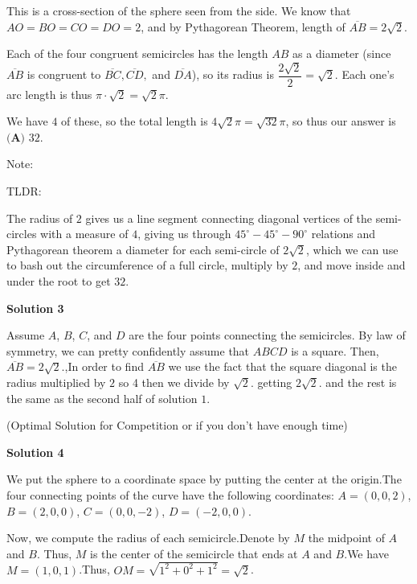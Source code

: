 \begin{enumerate}
 This is a cross-section of the sphere seen from the side. We know that ${AO}={BO}={CO}={DO}=2$, and by Pythagorean Theorem, length of  $\overline{AB}=2\sqrt2.$ 

 Each of the four congruent semicircles has the length $AB$ as a diameter (since $\overline{AB}$ is congruent to $\overline{BC},\overline{CD},$ and $\overline{DA}$), so its radius is $\dfrac{2\sqrt2}2=\sqrt2.$ Each one's arc length is thus $\pi\cdot\sqrt2=\sqrt2\pi.$ 

 We have $4$ of these, so the total length is $4\sqrt2\pi=\sqrt{32}\pi$, so thus our answer is $\boxed{\textbf{(A) }32.}$

 


 Note:

 TLDR:

 The radius of $2$ gives us a line segment connecting diagonal vertices of the semi-circles with a measure of $4$, giving us through $45^{\circ}-45^{\circ}-90^{\circ}$ relations and Pythagorean theorem a diameter for each semi-circle of $2\sqrt{2}$, which we can use to bash out the circumference of a full circle, multiply by $2$, and move inside and under the root to get $32$.

 



\textbf{Solution 3}

Assume $A$, $B$, $C$, and $D$ are the four points connecting the semicircles. By law of symmetry, we can pretty confidently assume that $ABCD$ is a square. Then, $\overline{AB} = 2\sqrt2.$,In order to find $\overline{AB}$ we use the fact that the square diagonal is the radius multiplied by $2$ so 4 then we divide by $\sqrt2.$ getting $2\sqrt2.$ and the rest is the same as the second half of solution $1$.

 (Optimal Solution for Competition or if you don't have enough time)

 



\textbf{Solution 4}

We put the sphere to a coordinate space by putting the center at the origin.The four connecting points of the curve have the following coordinates: $A = \left( 0, 0, 2 \right)$, $B = \left( 2, 0, 0 \right)$, $C = \left( 0, 0, -2 \right)$, $D = \left( -2, 0, 0 \right)$.

 Now, we compute the radius of each semicircle.Denote by $M$ the midpoint of $A$ and $B$. Thus, $M$ is the center of the semicircle that ends at $A$ and $B$.We have $M = \left( 1, 0, 1 \right)$.Thus, $OM = \sqrt{1^2 + 0^2 + 1^2} = \sqrt{2}$.


\end{enumerate}
